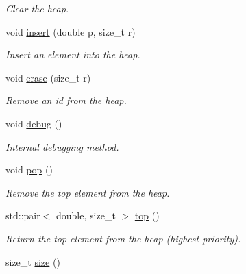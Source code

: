 \begin{DoxyCompactItemize}
\begin{DoxyCompactList}\small\item\em Clear the heap. \end{DoxyCompactList}\item 
void \hyperlink{classmerlin_1_1indexed__heap_ae28eb7d27ffe353598f9471c908dab26}{insert} (double p, size\+\_\+t r)
\begin{DoxyCompactList}\small\item\em Insert an element into the heap. \end{DoxyCompactList}\item 
void \hyperlink{classmerlin_1_1indexed__heap_a81b46a7ef4e2a01a478bcb40bb10f7c4}{erase} (size\+\_\+t r)
\begin{DoxyCompactList}\small\item\em Remove an id from the heap. \end{DoxyCompactList}\item 
void \hyperlink{classmerlin_1_1indexed__heap_ae89fcb8f1e0de7ce20b7582877fc4720}{debug} ()\hypertarget{classmerlin_1_1indexed__heap_ae89fcb8f1e0de7ce20b7582877fc4720}{}\label{classmerlin_1_1indexed__heap_ae89fcb8f1e0de7ce20b7582877fc4720}

\begin{DoxyCompactList}\small\item\em Internal debugging method. \end{DoxyCompactList}\item 
void \hyperlink{classmerlin_1_1indexed__heap_ae9a7ae73911df2a7d5724b1253ea3fdb}{pop} ()\hypertarget{classmerlin_1_1indexed__heap_ae9a7ae73911df2a7d5724b1253ea3fdb}{}\label{classmerlin_1_1indexed__heap_ae9a7ae73911df2a7d5724b1253ea3fdb}

\begin{DoxyCompactList}\small\item\em Remove the top element from the heap. \end{DoxyCompactList}\item 
std\+::pair$<$ double, size\+\_\+t $>$ \hyperlink{classmerlin_1_1indexed__heap_a53f02b83181ec59ee68582d3df5c5986}{top} ()\hypertarget{classmerlin_1_1indexed__heap_a53f02b83181ec59ee68582d3df5c5986}{}\label{classmerlin_1_1indexed__heap_a53f02b83181ec59ee68582d3df5c5986}

\begin{DoxyCompactList}\small\item\em Return the top element from the heap (highest priority). \end{DoxyCompactList}\item 
size\+\_\+t \hyperlink{classmerlin_1_1indexed__heap_a8b65813fb7de2b0ae547685f72bddd5c}{size} ()\hypertarget{classmerlin_1_1indexed__heap_a8b65813fb7de2b0ae547685f72bddd5c}{}\label{classmerlin_1_1indexed__heap_a8b65813fb7de2b0ae547685f72bddd5c}


\end{DoxyCompactItemize}
